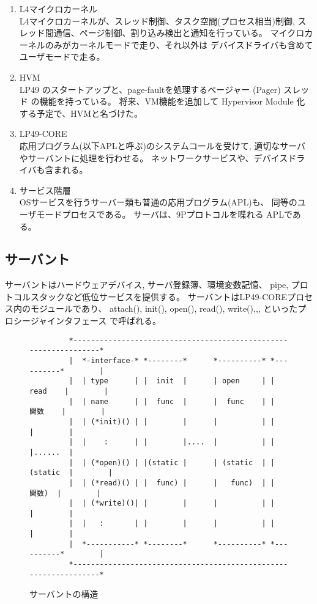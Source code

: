 \documentclass{jarticle}
\begin{document}
\begin{enumerate}
\item   L4マイクロカーネル  \\
    L4マイクロカーネルが、スレッド制御、タスク空間(プロセス相当)制御, 
    スレッド間通信、ページ制御、割り込み検出と通知を行っている。
    マイクロカーネルのみがカーネルモードで走り、それ以外は
    デバイスドライバも含めてユーザモードで走る。

    
\item  HVM \\
    LP49 のスタートアップと、page-faultを処理するページャー (Pager) スレッド 
    の機能を持っている。
    将来、VM機能を追加して Hypervisor Module 化する予定で、HVMと名づけた。

\item  LP49-CORE \\
    応用プログラム(以下APLと呼ぶ)のシステムコールを受けて, 
    適切なサーバやサーバントに処理を行わせる。 
    ネットワークサービスや、デバイスドライバも含まれる。
    
\item  サービス階層 \\
    OSサービスを行うサーバー類も普通の応用プログラム(APL)も、
    同等のユーザモードプロセスである。
    サーバは、9Pプロトコルを喋れる APLである。
\end{enumerate}    



\subsection{サーバント}

   サーバントはハードウェアデバイス, サーバ登録簿、環境変数記憶、
pipe, プロトコルスタックなど低位サービスを提供する。
サーバントはLP49-COREプロセス内のモジュールであり、
attach(), init(), open(), read(), write(),,, といったプロシージャインタフェース
で呼ばれる。


\begin{figure}[htb]
\begin{center}
{\small
\begin{verbatim}
         *-----------------------------------------------------------------*  
         |  *-interface-* *--------*      *----------* *----------*        |  
         |  | type      | |  init  |      | open     | |  read    |        |  
         |  | name      | |  func  |      |  func    | |  関数    |        |  
         |  | (*init)() | |        |      |          | |          |        |  
         |  |    :      | |        |....  |          | |          |......  |  
         |  | (*open)() | |(static |      | (static  | | (static  |        |  
         |  | (*read)() | |  func) |      |   func)  | |   関数)  |        |  
         |  | (*write)()| |        |      |          | |          |        |  
         |  |   :       | |        |      |          | |          |        |  
         |  *-----------* *--------*      *----------* *----------*        |  
         *-----------------------------------------------------------------*  
\end{verbatim}
}
\caption{サーバントの構造}
\label{fig:servant}
\end{center}
\end{figure}
\end{document}
